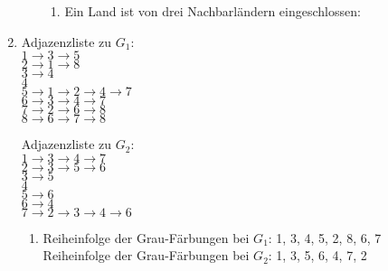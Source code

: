 \documentclass{article}
\begin{document}
\begin{enumerate}[\bfseries1.]
\begin{enumerate}
\begin{enumerate}
            \item %
                Ein Land ist von drei Nachbarländern eingeschlossen:
                    
        \end{enumerate}
    \end{enumerate}
\newpage
\item  %
    Adjazenzliste zu $G_1$:
    \\$1 \rightarrow 3 \rightarrow 5$
    \\$2 \rightarrow 1 \rightarrow 8$
    \\$3 \rightarrow 4$
    \\$4$
    \\$5 \rightarrow 1 \rightarrow 2 \rightarrow 4 \rightarrow 7$ 
    \\$6 \rightarrow 3 \rightarrow 4 \rightarrow 7$
    \\$7 \rightarrow 2 \rightarrow 6 \rightarrow 8$
    \\$8 \rightarrow 6 \rightarrow 7 \rightarrow 8$
    
    Adjazenzliste zu $G_2$:
    \\$1 \rightarrow 3 \rightarrow 4 \rightarrow 7$
    \\$2 \rightarrow 3 \rightarrow 5 \rightarrow 6$ 
    \\$3 \rightarrow 5$
    \\$4$
    \\$5 \rightarrow 6$
    \\$6 \rightarrow 4$
    \\$7 \rightarrow 2 \rightarrow 3 \rightarrow 4 \rightarrow 6$

    \begin{enumerate}
      \item %
      Reiheinfolge der Grau-Färbungen bei $G_1$: 1, 3, 4, 5, 2, 8, 6, 7
      \\Reiheinfolge der Grau-Färbungen bei $G_2$: 1, 3, 5, 6, 4, 7, 2
      

\end{enumerate}
\end{enumerate}
\end{document}
